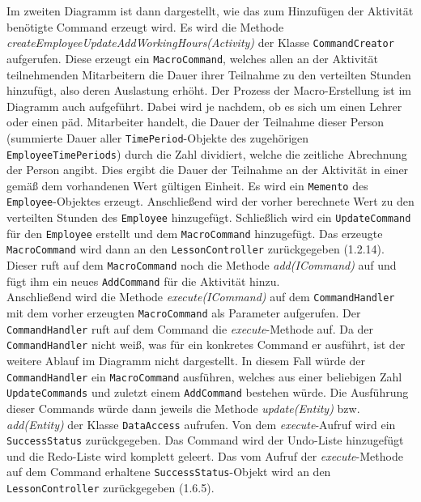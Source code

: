 \documentclass[fontsize=12pt,paper=a4,twoside]{scrartcl}
\begin{document}
Im zweiten Diagramm ist dann dargestellt, wie das zum Hinzufügen der Aktivität benötigte Command erzeugt wird. Es wird die Methode \textit{createEmployeeUpdateAddWorkingHours(Activity)} der Klasse \texttt{CommandCreator} aufgerufen. Diese erzeugt ein \texttt{MacroCommand}, welches allen an der Aktivität teilnehmenden Mitarbeitern die Dauer ihrer Teilnahme zu den verteilten Stunden hinzufügt, also deren Auslastung erhöht. Der Prozess der Macro-Erstellung ist im Diagramm auch aufgeführt. Dabei wird je nachdem, ob es sich um einen Lehrer oder einen päd. Mitarbeiter handelt, die Dauer der Teilnahme dieser Person (summierte Dauer aller \texttt{TimePeriod}-Objekte des zugehörigen \texttt{EmployeeTimePeriods}) durch die Zahl dividiert, welche die zeitliche Abrechnung der Person angibt. Dies ergibt die Dauer der Teilnahme an der Aktivität in einer gemäß dem vorhandenen Wert gültigen Einheit. Es wird ein \texttt{Memento} des \texttt{Employee}-Objektes erzeugt. Anschließend wird der vorher berechnete Wert zu den verteilten Stunden des \texttt{Employee} hinzugefügt. Schließlich wird ein \texttt{UpdateCommand} für den \texttt{Employee} erstellt und dem \texttt{MacroCommand} hinzugefügt. Das erzeugte \texttt{MacroCommand} wird dann an den \texttt{LessonController} zurückgegeben (1.2.14). Dieser ruft auf dem \texttt{MacroCommand} noch die Methode \textit{add(ICommand)} auf und fügt ihm ein neues \texttt{AddCommand} für die Aktivität hinzu. \\

Anschließend wird die Methode \textit{execute(ICommand)} auf dem \texttt{CommandHandler} mit dem vorher erzeugten \texttt{MacroCommand} als Parameter aufgerufen. Der \texttt{CommandHandler} ruft auf dem Command die \textit{execute}-Methode auf. Da der \texttt{CommandHandler} nicht weiß, was für ein konkretes Command er ausführt, ist der weitere Ablauf im Diagramm nicht dargestellt. In diesem Fall würde der \texttt{CommandHandler} ein \texttt{MacroCommand} ausführen, welches aus einer beliebigen Zahl \texttt{UpdateCommands} und zuletzt einem \texttt{AddCommand} bestehen würde. Die Ausführung dieser Commands würde dann jeweils die Methode \textit{update(Entity)} bzw. \textit{add(Entity)} der Klasse \texttt{DataAccess} aufrufen. Von dem \textit{execute}-Aufruf wird ein \texttt{SuccessStatus} zurückgegeben. Das Command wird der Undo-Liste hinzugefügt und die Redo-Liste wird komplett geleert. Das vom Aufruf der \textit{execute}-Methode auf dem Command erhaltene \texttt{SuccessStatus}-Objekt wird an den \texttt{LessonController} zurückgegeben (1.6.5). \\
\end{document}
